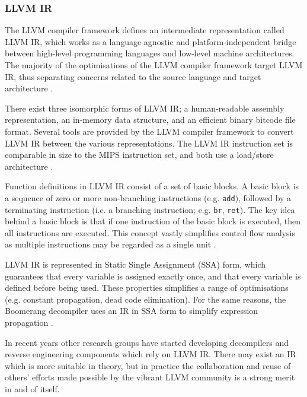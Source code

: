 
\subsubsection{LLVM IR}
\label{sec:lit_review_llvm_ir}

The LLVM compiler framework defines an intermediate representation called LLVM IR, which works as a language-agnostic and platform-independent bridge between high-level programming languages and low-level machine architectures. The majority of the optimisations of the LLVM compiler framework target LLVM IR, thus separating concerns related to the source language and target architecture \cite{llvm_architecture}.

There exist three isomorphic forms of LLVM IR; a human-readable assembly representation, an in-memory data structure, and an efficient binary bitcode file format. Several tools are provided by the LLVM compiler framework to convert LLVM IR between the various representations. The LLVM IR instruction set is comparable in size to the MIPS instruction set, and both use a load/store architecture \cite{mips_ref,llvm_lang_ref}.

Function definitions in LLVM IR consist of a set of basic blocks. A basic block is a sequence of zero or more non-branching instructions (e.g. \texttt{add}), followed by a terminating instruction (i.e. a branching instruction; e.g. \texttt{br}, \texttt{ret}). The key idea behind a basic block is that if one instruction of the basic block is executed, then all instructions are executed. This concept vastly simplifies control flow analysis as multiple instructions may be regarded as a single unit \cite{decomp_of_llvm}.

LLVM IR is represented in Static Single Assignment (SSA) form, which guarantees that every variable is assigned exactly once, and that every variable is defined before being used. These properties simplifies a range of optimisations (e.g. constant propagation, dead code elimination). For the same reasons, the Boomerang decompiler uses an IR in SSA form to simplify expression propagation \cite{ssa_for_decomp}.

In recent years other research groups have started developing decompilers \cite{decomp_of_llvm,retargetable_decomp} and reverse engineering components \cite{mcsema} which rely on LLVM IR. There may exist an IR which is more suitable in theory, but in practice the collaboration and reuse of others' efforts made possible by the vibrant LLVM community is a strong merit in and of itself.

